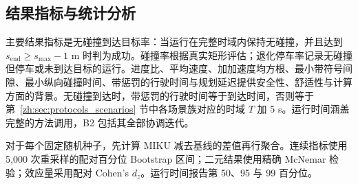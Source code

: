 \subsection{结果指标与统计分析}
\label{zh:sec:outcomes_stats}

主要结果指标是无碰撞到达目标率：当运行在完整时域内保持无碰撞，并且达到 $s_{\mathrm{end}}\geq s_{\max}-1$ m 时判为成功。碰撞率根据真实矩形评估；退化停车率记录无碰撞但停车或未到达目标的运行。进度比、平均速度、加加速度均方根、最小带符号间隙、最小纵向碰撞时间、带惩罚的行驶时间与规划延迟提供安全性、舒适性与计算方面的背景。无碰撞到达时，带惩罚的行驶时间等于到达时间，否则等于第~\ref{zh:sec:protocols_scenarios} 节中各场景族对应的时域 $T$ 加 5 s。运行时间涵盖完整的方法调用，B2 包括其全部协调迭代。

对于每个固定随机种子，先计算 MIKU 减去基线的差值再行聚合。连续指标使用 5{,}000 次重采样的配对百分位 Bootstrap 区间；二元结果使用精确 McNemar 检验；效应量采用配对 Cohen's $d_z$。运行时间报告第 50、95 与 99 百分位。
